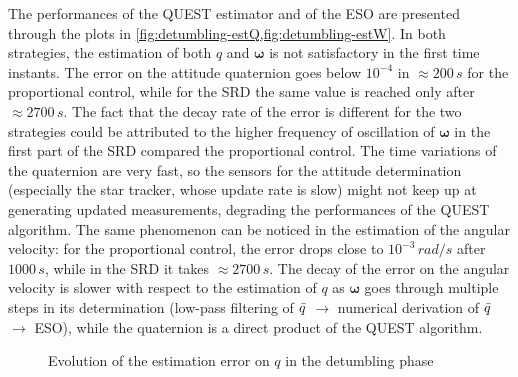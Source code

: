 The performances of the QUEST estimator and of the ESO are presented through the plots in \cref{fig:detumbling-estQ,fig:detumbling-estW}. In both strategies, the estimation of both $q$ and $\bm{\omega}$ is not satisfactory in the first time instants. The error on the attitude quaternion goes below $10^{-4}$ in $\approx 200 \,s$ for the proportional control, while for the SRD the same value is reached only after $\approx 2700 \,s$. The fact that the decay rate of the error is different for the two strategies could be attributed to the higher frequency of oscillation of $\bm{\omega}$ in the first part of the SRD compared the proportional control. The time variations of the quaternion are very fast, so the sensors for the attitude determination (especially the star tracker, whose update rate is slow) might not keep up at generating updated measurements, degrading the performances of the QUEST algorithm. The same phenomenon can be noticed in the estimation of the angular velocity: for the proportional control, the error drops close to $10^{-3}\, rad/s$ after $1000\, s$, while in the SRD it takes $\approx 2700 \,s$. The decay of the error on the angular velocity is slower with respect to the estimation of $q$ as $\bm{\omega}$ goes through multiple steps in its determination (low-pass filtering of $\Bar{q}$ $\rightarrow$ numerical derivation of $\Bar{q}$ $\rightarrow$ ESO), while the quaternion is a direct product of the QUEST algorithm.

\begin{figure}[h!]
    \centering
    \caption{Evolution of the estimation error on $q$ in the detumbling phase}
    \label{fig:detumbling-estQ}
\end{figure}

